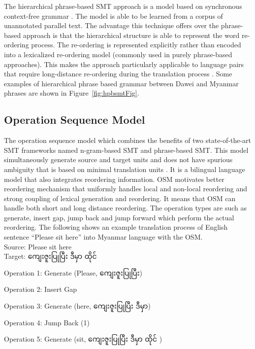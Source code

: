 \documentclass[conference]{IEEEtran}
\newcommand{\quotes}[1]{``#1''}
\begin{document}
The hierarchical phrase-based SMT approach  is a model based on synchronous context-free grammar \cite{b14}. The model is able to be learned from a corpus of unannotated parallel text. The advantage this technique offers over the phrase-based approach is that the hierarchical structure is able to represent the word re-ordering process. The re-ordering is represented explicitly rather than encoded into a lexicalized re-ordering model (commonly used in purely phrase-based approaches). This makes the approach particularly applicable to language pairs that require long-distance re-ordering during the translation process \cite{b15}. Some examples of hierarchical phrase based grammar between Dawei and Myanmar phrases are shown in Figure~\ref{fig:hpbsmtFig}.


\subsection {Operation Sequence Model}
\label{subsec:OSM}

The operation sequence model which combines the benefits of two state-of-the-art SMT frameworks named n-gram-based SMT and phrase-based SMT. This model simultaneously generate source and target units and does not have spurious ambiguity that is based on minimal translation units \cite{b16} \cite{b17}. It is a bilingual language model that also integrates reordering information. OSM motivates better reordering mechanism that uniformly handles local and non-local reordering and strong coupling of lexical generation and reordering. It means that OSM can handle both short and long distance reordering. The operation types are such as generate, insert gap, jump back and jump forward which perform the actual reordering. The following shows an example translation process of English sentence \quotes{Please sit here} into Myanmar language with the OSM.\\

\noindent Source: Please sit here\\
Target: {\padauktext ကျေးဇူးပြုပြီး ဒီမှာ ထိုင် }\\

\begin{description}
   \item Operation 1: Generate (Please, {\padauktext ကျေးဇူးပြုပြီး})
   \item Operation 2: Insert Gap
   \item Operation 3: Generate (here, {\padauktext ကျေးဇူးပြုပြီး ဒီမှာ})
   \item Operation 4: Jump Back (1)
   \item Operation 5: Generate (sit, {\padauktext ကျေးဇူးပြုပြီး ဒီမှာ ထိုင် })
\end{description}
\end{document}
